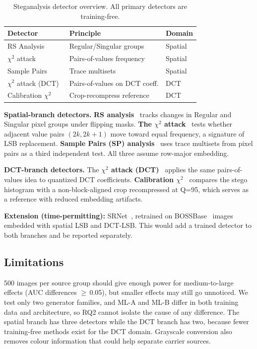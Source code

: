 \documentclass[10pt,twocolumn,a4paper]{article}
\begin{document}
\begin{table}[h]
\centering
\caption{Steganalysis detector overview. All primary detectors are training-free.}
\label{tab:detectors}
\scriptsize
\setlength{\tabcolsep}{4pt}
\begin{tabular}{@{}lll@{}}
\toprule
\textbf{Detector} & \textbf{Principle} & \textbf{Domain} \\
\midrule
RS Analysis~\cite{fridrich2001lsb} & Regular/Singular groups & Spatial \\
$\chi^2$ attack~\cite{westfeld1999chi} & Pairs-of-values frequency & Spatial \\
Sample Pairs~\cite{dumitrescu2003sp} & Trace multisets & Spatial \\
$\chi^2$ attack (DCT)~\cite{westfeld1999chi} & Pairs-of-values on DCT coeff. & DCT \\
Calibration $\chi^2$~\cite{fridrich2003calib} & Crop-recompress reference & DCT \\
\bottomrule
\end{tabular}
\end{table}

\textbf{Spatial-branch detectors.} \textbf{RS analysis}~\cite{fridrich2001lsb} tracks changes in Regular and Singular pixel groups under flipping masks. \textbf{The $\chi^2$ attack}~\cite{westfeld1999chi} tests whether adjacent value pairs $(2k, 2k\!+\!1)$ move toward equal frequency, a signature of LSB replacement. \textbf{Sample Pairs (SP) analysis}~\cite{dumitrescu2003sp} uses trace multisets from pixel pairs as a third independent test. All three assume row-major embedding.

\textbf{DCT-branch detectors.} The \textbf{$\chi^2$ attack (DCT)}~\cite{westfeld1999chi} applies the same pairs-of-values idea to quantized DCT coefficients. \textbf{Calibration $\chi^2$}~\cite{fridrich2003calib} compares the stego histogram with a non-block-aligned crop recompressed at Q=95, which serves as a reference with reduced embedding artifacts.

\textbf{Extension (time-permitting):} SRNet~\cite{boroumand2019srnet}, retrained on BOSSBase~\cite{bas2011boss} images embedded with spatial LSB and DCT-LSB. This would add a trained detector to both branches and be reported separately.

\subsection{Limitations}

500 images per source group should give enough power for medium-to-large effects (AUC differences $\geq$\,0.05), but smaller effects may still go unnoticed. We test only two generator families, and ML-A and ML-B differ in both training data and architecture, so RQ2 cannot isolate the cause of any difference. The spatial branch has three detectors while the DCT branch has two, because fewer training-free methods exist for the DCT domain. Grayscale conversion also removes colour information that could help separate carrier sources.
\end{document}
